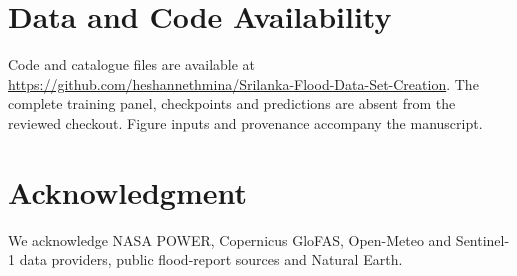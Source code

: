 \documentclass[conference]{IEEEtran}
\begin{document}
\section*{Data and Code Availability}
Code and catalogue files are available at
\url{https://github.com/heshannethmina/Srilanka-Flood-Data-Set-Creation}.
The complete training panel, checkpoints and predictions are absent from the
reviewed checkout. Figure inputs and provenance accompany the manuscript.

\balance
\section*{Acknowledgment}
We acknowledge NASA POWER, Copernicus GloFAS, Open-Meteo and Sentinel-1 data
providers, public flood-report sources and Natural Earth.
\end{document}

